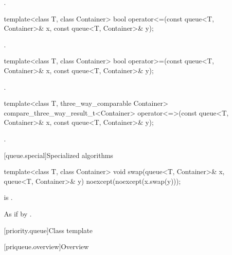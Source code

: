 \begin{itemdescr}
\pnum
\returns
{}.
\end{itemdescr}

%
\begin{itemdecl}
template<class T, class Container>
  bool operator<=(const queue<T, Container>& x, const queue<T, Container>& y);
\end{itemdecl}

\begin{itemdescr}
\pnum
\returns
{}.
\end{itemdescr}

%
\begin{itemdecl}
template<class T, class Container>
    bool operator>=(const queue<T, Container>& x,
                    const queue<T, Container>& y);
\end{itemdecl}

\begin{itemdescr}
\pnum
\returns
{}.
\end{itemdescr}

%
\begin{itemdecl}
template<class T, three_way_comparable Container>
  compare_three_way_result_t<Container>
    operator<=>(const queue<T, Container>& x, const queue<T, Container>& y);
\end{itemdecl}

\begin{itemdescr}
\pnum
\returns
{}.
\end{itemdescr}

[queue.special]{Specialized algorithms}

%
\begin{itemdecl}
template<class T, class Container>
  void swap(queue<T, Container>& x, queue<T, Container>& y) noexcept(noexcept(x.swap(y)));
\end{itemdecl}

\begin{itemdescr}
\pnum
\constraints
{} is .

\pnum
\effects
As if by .
\end{itemdescr}

[priority.queue]{Class template }

[priqueue.overview]{Overview}

